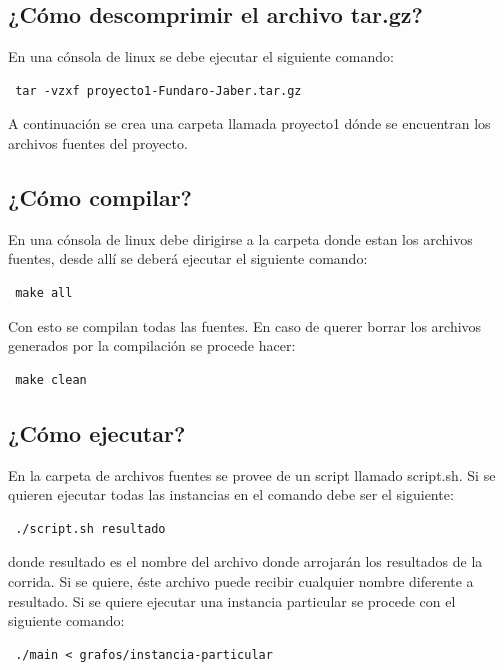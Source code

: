 \documentclass[a4paper,10pt]{article}
\begin{document}
\subsection{¿Cómo descomprimir el archivo tar.gz?}
En una cónsola de linux se debe ejecutar el siguiente comando:
\begin{verbatim}
 tar -vzxf proyecto1-Fundaro-Jaber.tar.gz
\end{verbatim}
A continuación se crea una carpeta llamada proyecto1 dónde se encuentran los archivos fuentes del proyecto.

\subsection{¿Cómo compilar?}
En una cónsola de linux debe dirigirse a la carpeta donde estan los archivos fuentes, desde allí se deberá ejecutar
el siguiente comando:
\begin{verbatim}
 make all
\end{verbatim}
Con esto se compilan todas las fuentes. En caso de querer borrar los archivos generados por la compilación se procede hacer:
\begin{verbatim}
 make clean
\end{verbatim}

\subsection{¿Cómo ejecutar?}
En la carpeta de archivos fuentes se provee de un script llamado script.sh. Si se quieren ejecutar todas las instancias 
en el comando debe ser el siguiente:
\begin{verbatim}
 ./script.sh resultado
\end{verbatim}
donde resultado es el nombre del archivo donde arrojarán los resultados de la corrida. Si se quiere, éste archivo puede recibir cualquier nombre diferente a resultado.
Si se quiere ejecutar una instancia particular se procede con el siguiente comando:
\begin{verbatim}
 ./main < grafos/instancia-particular
\end{verbatim}
\newpage
\end{document}
